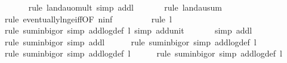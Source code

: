 \begin{isabellebody}
\ \ \ \ \ \isamarkupfalse%
\ {\isacharparenleft}{\kern0pt}rule\ landau{\isacharunderscore}{\kern0pt}o{\isachardot}{\kern0pt}mult{\isacharcomma}{\kern0pt}\ simp\ add{\isacharcolon}{\kern0pt}l{}{\isacharparenright}{\kern0pt}\isanewline
\ \ \ \ \ \isamarkupfalse%
\ {\isacharparenleft}{\kern0pt}rule\ landau{\isacharunderscore}{\kern0pt}sum{\isacharparenright}{\kern0pt}\isanewline
\ \ \ \ \ \ \ \ \isamarkupfalse%
\ {\isacharparenleft}{\kern0pt}rule\ eventually{\isacharunderscore}{\kern0pt}ln{\isacharunderscore}{\kern0pt}ge{\isacharunderscore}{\kern0pt}iff{\isacharbrackleft}{\kern0pt}OF\ n{\isacharunderscore}{\kern0pt}inf{\isacharbrackright}{\kern0pt}{\isacharparenright}{\kern0pt}\isanewline
\ \ \ \ \ \ \ \isamarkupfalse%
\ {\isacharparenleft}{\kern0pt}rule\ l{}{\isacharparenright}{\kern0pt}\isanewline
\ \ \ \ \ \ \isamarkupfalse%
\ {\isacharparenleft}{\kern0pt}rule\ sum{\isacharunderscore}{\kern0pt}in{\isacharunderscore}{\kern0pt}bigo{\isacharunderscore}{\kern0pt}r{\isacharcomma}{\kern0pt}\ simp\ add{\isacharcolon}{\kern0pt}log{\isacharunderscore}{\kern0pt}def\ l{}{\isacharcomma}{\kern0pt}\ simp\ add{\isacharcolon}{\kern0pt}unit{\isacharunderscore}{\kern0pt}{}{\isacharparenright}{\kern0pt}\isanewline
\ \ \ \ \ \isamarkupfalse%
\ {\isacharparenleft}{\kern0pt}simp\ add{\isacharcolon}{\kern0pt}l{}{\isacharparenright}{\kern0pt}\isanewline
\ \ \ \ \isamarkupfalse%
\ {\isacharparenleft}{\kern0pt}rule\ sum{\isacharunderscore}{\kern0pt}in{\isacharunderscore}{\kern0pt}bigo{\isacharunderscore}{\kern0pt}r{\isacharcomma}{\kern0pt}\ simp\ add{\isacharcolon}{\kern0pt}l{}{\isacharparenright}{\kern0pt}\isanewline
\ \ \ \ \isamarkupfalse%
\ {\isacharparenleft}{\kern0pt}rule\ sum{\isacharunderscore}{\kern0pt}in{\isacharunderscore}{\kern0pt}bigo{\isacharunderscore}{\kern0pt}r{\isacharcomma}{\kern0pt}\ simp\ add{\isacharcolon}{\kern0pt}log{\isacharunderscore}{\kern0pt}def\ l{}{\isacharparenright}{\kern0pt}\isanewline
\ \ \ \ \isamarkupfalse%
\ {\isacharparenleft}{\kern0pt}rule\ sum{\isacharunderscore}{\kern0pt}in{\isacharunderscore}{\kern0pt}bigo{\isacharunderscore}{\kern0pt}r{\isacharcomma}{\kern0pt}\ simp\ add{\isacharcolon}{\kern0pt}log{\isacharunderscore}{\kern0pt}def\ l{}{\isacharparenright}{\kern0pt}\isanewline
\ \ \ \ \isamarkupfalse%
\ {\isacharparenleft}{\kern0pt}rule\ sum{\isacharunderscore}{\kern0pt}in{\isacharunderscore}{\kern0pt}bigo{\isacharunderscore}{\kern0pt}r{\isacharcomma}{\kern0pt}\ simp\ add{\isacharcolon}{\kern0pt}log{\isacharunderscore}{\kern0pt}def\ l{}{\isacharparenright}{\kern0pt}\isanewline

\end{isabellebody}
